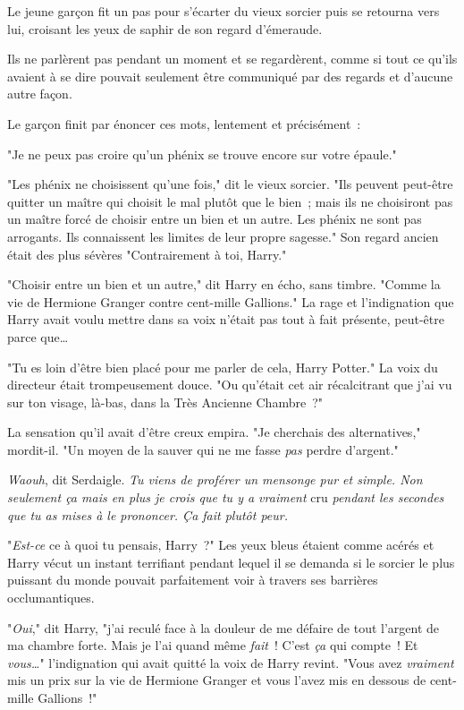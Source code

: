 Le jeune garçon fit un pas pour s'écarter du vieux sorcier puis se retourna vers lui, croisant les yeux de saphir de son regard d'émeraude.

Ils ne parlèrent pas pendant un moment et se regardèrent, comme si tout ce qu'ils avaient à se dire pouvait seulement être communiqué par des regards et d'aucune autre façon.

Le garçon finit par énoncer ces mots, lentement et précisément~:

"Je ne peux pas croire qu'un phénix se trouve encore sur votre épaule."

"Les phénix ne choisissent qu'une fois," dit le vieux sorcier. "Ils peuvent peut-être quitter un maître qui choisit le mal plutôt que le bien~; mais ils ne choisiront pas un maître forcé de choisir entre un bien et un autre. Les phénix ne sont pas arrogants. Ils connaissent les limites de leur propre sagesse." Son regard ancien était des plus sévères "Contrairement à toi, Harry."

"Choisir entre un bien et un autre," dit Harry en écho, sans timbre. "Comme la vie de Hermione Granger contre cent-mille Gallions." La rage et l'indignation que Harry avait voulu mettre dans sa voix n'était pas tout à fait présente, peut-être parce que…

"Tu es loin d'être bien placé pour me parler de cela, Harry Potter." La voix du directeur était trompeusement douce. "Ou qu'était cet air récalcitrant que j'ai vu sur ton visage, là-bas, dans la Très Ancienne Chambre~?"

La sensation qu'il avait d'être creux empira. "Je cherchais des alternatives," mordit-il. "Un moyen de la sauver qui ne me fasse \emph{pas} perdre d'argent."

\emph{Waouh}, dit Serdaigle. \emph{Tu viens de proférer un mensonge pur et simple. Non seulement ça mais en plus je crois que tu y a vraiment} cru \emph{pendant les secondes que tu as mises à le prononcer. Ça fait plutôt peur.}

"\emph{Est-ce} ce à quoi tu pensais, Harry~?" Les yeux bleus étaient comme acérés et Harry vécut un instant terrifiant pendant lequel il se demanda si le sorcier le plus puissant du monde pouvait parfaitement voir à travers ses barrières occlumantiques.

"\emph{Oui}," dit Harry, "j'ai reculé face à la douleur de me défaire de tout l'argent de ma chambre forte. Mais je l'ai quand même \emph{fait}~! C'est \emph{ça} qui compte~! Et \emph{vous…}" l'indignation qui avait quitté la voix de Harry revint. "Vous avez \emph{vraiment} mis un prix sur la vie de Hermione Granger et vous l'avez mis en dessous de cent-mille Gallions~!"

